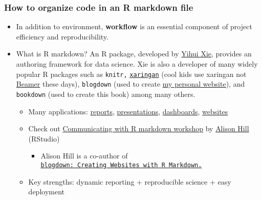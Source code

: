 \documentclass[
  letterpaper,
  DIV=11,
  numbers=noendperiod]{scrreprt}
\providecommand{\tightlist}{%
  \setlength{\itemsep}{0pt}\setlength{\parskip}{0pt}}\usepackage{longtable,booktabs,array}
\begin{document}
\hypertarget{how-to-organize-code-in-an-r-markdown-file}{%
\subsubsection*{How to organize code in an R markdown
file}\label{how-to-organize-code-in-an-r-markdown-file}}

\begin{itemize}
\item
  In addition to environment, \textbf{workflow} is an essential
  component of project efficiency and reproducibility.
\item
  What is R markdown? An R package, developed by
  \href{https://yihui.org/en/}{Yihui Xie}, provides an authoring
  framework for data science. Xie is also a developer of many widely
  popular R packages such as \texttt{knitr,}
  \href{https://GitHub.com/yihui/xaringan}{\texttt{xaringan}} (cool kids
  use xaringan not
  \href{https://en.wikipedia.org/wiki/Beamer_(LaTeX)}{Beamer} these
  days), \texttt{blogdown} (used to create
  \href{https://jaeyk.GitHub.io/}{my personal website}), and
  \texttt{bookdown} (used to create this book) among many others.

  \begin{itemize}
  \tightlist
  \item
    Many applications:
    \href{https://rstudio.GitHub.io/distill/basics.html}{reports},
    \href{https://bookdown.org/yihui/rmarkdown/xaringan.html}{presentations},
    \href{https://rmarkdown.rstudio.com/flexdashboard/}{dashboards},
    \href{https://bookdown.org/yihui/rmarkdown/websites.html}{websites}\\
  \item
    Check out \href{https://ysc-rmarkdown.netlify.app/}{Communicating
    with R markdown workshop} by \href{https://alison.rbind.io/}{Alison
    Hill} (RStudio)

    \begin{itemize}
    \tightlist
    \item
      Alison Hill is a co-author of
      \href{https://bookdown.org/yihui/blogdown/}{\texttt{blogdown:\ Creating\ Websites\ with\ R\ Markdown.}}
    \end{itemize}
  \item
    Key strengths: dynamic reporting + reproducible science + easy
    deployment
  \end{itemize}
\end{itemize}
\end{document}
